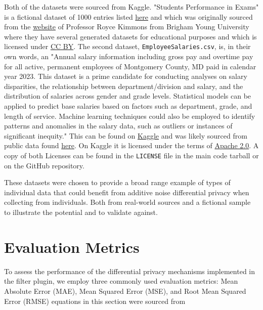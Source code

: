 Both of the datasets were sourced from Kaggle. "Students Performance in Exams" is a fictional dataset of 1000 entries listed \href{https://www.kaggle.com/datasets/spscientist/students-performance-in-exams}{here} and which was originally sourced from the \href{http://roycekimmons.com/tools/generated_data/exams}{website} of Professor Royce Kimmons from Brigham Young University where they have several generated datasets for educational purposes and which is licensed under \href{https://creativecommons.org/licenses/by/4.0/}{CC BY}. The second dataset, \texttt{EmployeeSalaries.csv}, is, in their own words, an "Annual salary information including gross pay and overtime pay for all active, permanent employees of Montgomery County, MD paid in calendar year 2023. This dataset is a prime candidate for conducting analyses on salary disparities, the relationship between department/division and salary, and the distribution of salaries across gender and grade levels. Statistical models can be applied to predict base salaries based on factors such as department, grade, and length of service. Machine learning techniques could also be employed to identify patterns and anomalies in the salary data, such as outliers or instances of significant inequity."\cite{Maharaj_2024} This can be found on \href{https://www.kaggle.com/datasets/sahirmaharajj/employee-salaries-analysis}{Kaggle} and was likely sourced from public data found \href{https://catalog.data.gov/dataset/employee-salaries-2023/resource/e37ac7bc-895e-46a4-be93-07e1c07ee0eb}{here}. On Kaggle it is licensed under the terms of \href{https://www.apache.org/licenses/LICENSE-2.0}{Apache 2.0}. A copy of both Licenses can be found in the \texttt{LICENSE} file in the main code tarball or on the GitHub repository.

These datasets were chosen to provide a broad range example of types of individual data that could benefit from additive noise differential privacy when collecting from individuals. Both from real-world sources and a fictional sample to illustrate the potential and to validate against. 

\section{Evaluation Metrics}
To assess the performance of the differential privacy mechanisms implemented in the filter plugin, we employ three commonly used evaluation metrics: Mean Absolute Error (MAE), Mean Squared Error (MSE), and Root Mean Squared Error (RMSE) equations in this section were sourced from \cite{Hodson2022}

